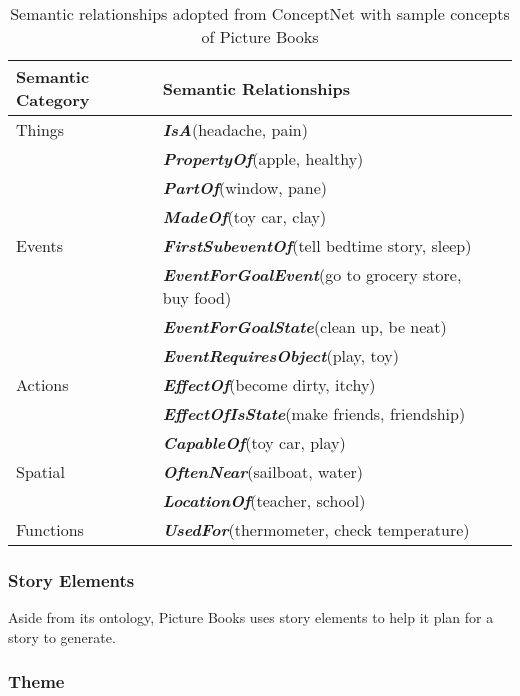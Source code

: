 \begin{table}[ht]   %
\centering
\caption{Semantic relationships adopted from ConceptNet \protect \cite{Liu:2004b} with sample concepts of Picture Books} \vspace{0.25em}
\begin{tabular}{|l|l|l|} \hline
Semantic Category & Semantic Relationships \\ \hline
Things       & \textbf{\emph{IsA}}(headache, pain)  \\ 
 			 & \textbf{\emph{PropertyOf}}(apple, healthy) \\ 
 			 & \textbf{\emph{PartOf}}(window, pane) \\
 			 & \textbf{\emph{MadeOf}}(toy car, clay) \\ \hline
Events		 & \textbf{\emph{FirstSubeventOf}}(tell bedtime story, sleep) \\
			 & \textbf{\emph{EventForGoalEvent}}(go to grocery store, buy food) \\
			 & \textbf{\emph{EventForGoalState}}(clean up, be neat) \\
			 & \textbf{\emph{EventRequiresObject}}(play, toy) \\ \hline
Actions		 & \textbf{\emph{EffectOf}}(become dirty, itchy) \\
			 & \textbf{\emph{EffectOfIsState}}(make friends, friendship) \\
			 & \textbf{\emph{CapableOf}}(toy car, play) \\ \hline
Spatial		 & \textbf{\emph{OftenNear}}(sailboat, water) \\
			 & \textbf{\emph{LocationOf}}(teacher, school) \\ \hline
Functions	 & \textbf{\emph{UsedFor}}(thermometer, check temperature) \\ \hline
\end{tabular}
\label{tab:semanticrelationships}
\end{table}

\subsubsection{Story Elements}

Aside from its ontology, Picture Books uses story elements to help it plan for a story to generate. 

\subsubsection*{Theme}

